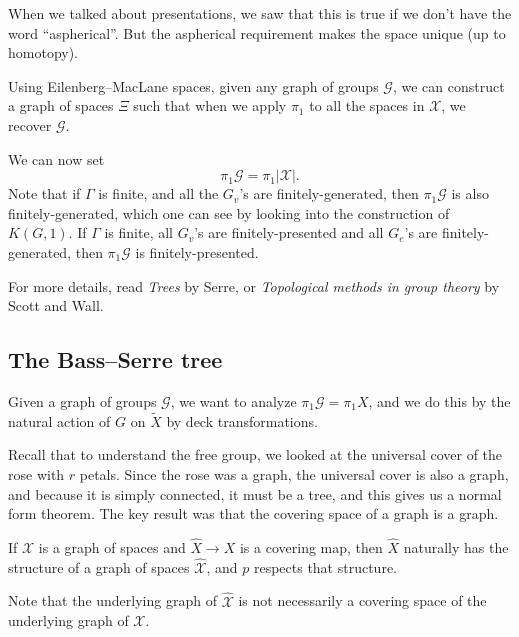 \documentclass[a4paper]{article}
\begin{document}
When we talked about presentations, we saw that this is true if we don't have the word ``aspherical''. But the aspherical requirement makes the space unique (up to homotopy).

Using Eilenberg--MacLane spaces, given any graph of groups $\mathcal{G}$, we can construct a graph of spaces $\Xi$ such that when we apply $\pi_1$ to all the spaces in $\mathcal{X}$, we recover $\mathcal{G}$.

We can now set
\[
  \pi_1 \mathcal{G} = \pi_1|\mathcal{X}|.
\]
Note that if $\Gamma$ is finite, and all the $G_v$'s are finitely-generated, then $\pi_1\mathcal{G}$ is also finitely-generated, which one can see by looking into the construction of $K(G, 1)$. If $\Gamma$ is finite, all $G_v$'s are finitely-presented and all $G_e$'s are finitely-generated, then $\pi_1 \mathcal{G}$ is finitely-presented.

For more details, read \emph{Trees} by Serre, or \emph{Topological methods in group theory} by Scott and Wall.

\subsection{The Bass--Serre tree}
Given a graph of groups $\mathcal{G}$, we want to analyze $\pi_ 1\mathcal{G} = \pi_1 X$, and we do this by the natural action of $G$ on $\tilde{X}$ by deck transformations.

Recall that to understand the free group, we looked at the universal cover of the rose with $r$ petals. Since the rose was a graph, the universal cover is also a graph, and because it is simply connected, it must be a tree, and this gives us a normal form theorem. The key result was that the covering space of a graph is a graph.

\begin{lemma}
  If $\mathcal{X}$ is a graph of spaces and $\hat{X} \to X$ is a covering map, then $\hat{X}$ naturally has the structure of a graph of spaces $\hat{\mathcal{X}}$, and $p$ respects that structure.
\end{lemma}
Note that the underlying graph of $\hat{\mathcal{X}}$ is not necessarily a covering space of the underlying graph of $\mathcal{X}$.
\end{document}

